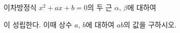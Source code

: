 이차방정식 $x^2+ax+b=0$의 두 근 $\alpha$, $\beta$에 대하여\par\smallskip{}\par\smallskip\noindent 이 성립한다. 이때 상수 $a$, $b$에 대하여 $ab$의 값을 구하시오.
